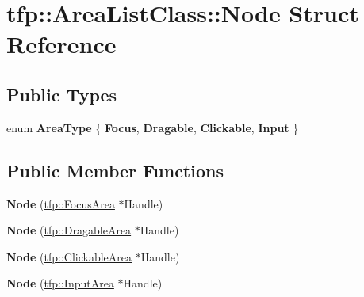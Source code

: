 \hypertarget{structtfp_1_1_area_list_class_1_1_node}{}\section{tfp\+:\+:Area\+List\+Class\+:\+:Node Struct Reference}
\label{structtfp_1_1_area_list_class_1_1_node}
\subsection*{Public Types}
\begin{DoxyCompactItemize}
\item 
\mbox{\label{structtfp_1_1_area_list_class_1_1_node_aed23600f7feae23c7ad61ecf8247e871}} 
enum {\bfseries Area\+Type} \{ {\bfseries Focus}, 
{\bfseries Dragable}, 
{\bfseries Clickable}, 
{\bfseries Input}
 \}
\end{DoxyCompactItemize}
\subsection*{Public Member Functions}
\begin{DoxyCompactItemize}
\item 
\mbox{\label{structtfp_1_1_area_list_class_1_1_node_a72a51811ed96156e9bfa66fe4c14a2fd}} 
{\bfseries Node} (\mbox{\hyperlink{classtfp_1_1_focus_area}{tfp\+::\+Focus\+Area}} $\ast$Handle)
\item 
\mbox{\label{structtfp_1_1_area_list_class_1_1_node_a41c088c2942d5db89b3be0bc7fefabf5}} 
{\bfseries Node} (\mbox{\hyperlink{classtfp_1_1_dragable_area}{tfp\+::\+Dragable\+Area}} $\ast$Handle)
\item 
\mbox{\label{structtfp_1_1_area_list_class_1_1_node_ab60f41b782685daf89db46cddbe7e25c}} 
{\bfseries Node} (\mbox{\hyperlink{classtfp_1_1_clickable_area}{tfp\+::\+Clickable\+Area}} $\ast$Handle)
\item 
\mbox{\label{structtfp_1_1_area_list_class_1_1_node_a2756be2f207b4f37ed8d8cf2f1b4902e}} 
{\bfseries Node} (\mbox{\hyperlink{classtfp_1_1_input_area}{tfp\+::\+Input\+Area}} $\ast$Handle)
\end{DoxyCompactItemize}
